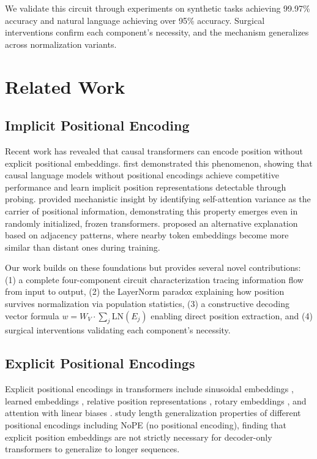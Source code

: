 \documentclass[11pt]{article}
\begin{document}
We validate this circuit through experiments on synthetic tasks achieving 99.97\% accuracy and natural language achieving over 95\% accuracy. Surgical interventions confirm each component's necessity, and the mechanism generalizes across normalization variants.

\section{Related Work}

\subsection{Implicit Positional Encoding}
Recent work has revealed that causal transformers can encode position without explicit positional embeddings. \citet{haviv2022transformer} first demonstrated this phenomenon, showing that causal language models without positional encodings achieve competitive performance and learn implicit position representations detectable through probing. \citet{chi-etal-2023-latent} provided mechanistic insight by identifying self-attention variance as the carrier of positional information, demonstrating this property emerges even in randomly initialized, frozen transformers. \citet{zuo2025position} proposed an alternative explanation based on adjacency patterns, where nearby token embeddings become more similar than distant ones during training.

Our work builds on these foundations but provides several novel contributions: (1) a complete four-component circuit characterization tracing information flow from input to output, (2) the LayerNorm paradox explaining how position survives normalization via population statistics, (3) a constructive decoding vector formula $w = W_V \cdot \sum_j \text{LN}(E_j)$ enabling direct position extraction, and (4) surgical interventions validating each component's necessity.

\subsection{Explicit Positional Encodings}
Explicit positional encodings in transformers include sinusoidal embeddings \citep{vaswani2017attention}, learned embeddings \citep{bert}, relative position representations \citep{shaw2018self}, rotary embeddings \citep{wang2021rotary}, and attention with linear biases \citep{alibi}. \citet{kazemnejad2023lenghGeneralization} study length generalization properties of different positional encodings including NoPE (no positional encoding), finding that explicit position embeddings are not strictly necessary for decoder-only transformers to generalize to longer sequences.
\end{document}
